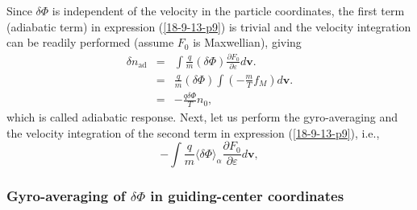 \documentclass{llncs}
\newcommand{\tmop}[1]{\ensuremath{\operatorname{#1}}}
\begin{document}
Since $\delta \Phi$ is independent of the velocity in the particle
coordinates, the first term (adiabatic term) in expression (\ref{18-9-13-p9})
is trivial and the velocity integration can be readily performed (assume $F_0$
is Maxwellian), giving
\begin{eqnarray}
  \delta n_{\tmop{ad}} & = & \int \frac{q}{m} (\delta \Phi) \frac{\partial
  F_0}{\partial \varepsilon} d\mathbf{v}. \nonumber\\
  & = & \frac{q}{m} (\delta \Phi) \int \left( - \frac{m}{T} f_M \right)
  d\mathbf{v}. \nonumber\\
  & = & - \frac{q \delta \Phi}{T} n_0,  \label{18-11-27-1}
\end{eqnarray}
which is called adiabatic response. Next, let us perform the gyro-averaging
and the velocity integration of the second term in expression
(\ref{18-9-13-p9}), i.e.,
\begin{equation}
  \label{21-9-18-a1} - \int \frac{q }{m} \langle \delta \Phi \rangle_{\alpha}
  \frac{\partial F_0}{\partial \varepsilon} d\mathbf{v},
\end{equation}

\subsubsection{Gyro-averaging of $\delta \Phi$ in guiding-center coordinates}
\end{document}

